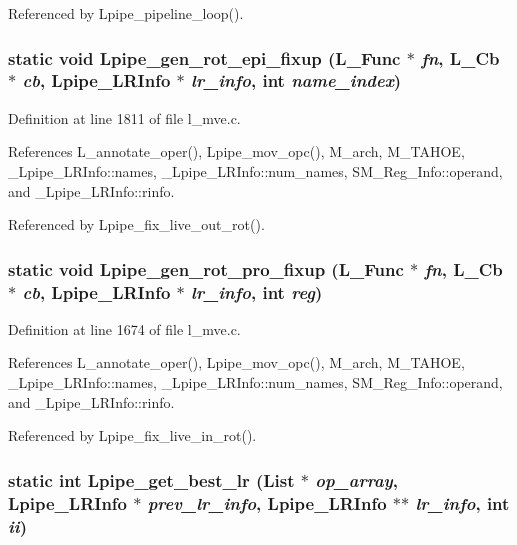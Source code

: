 Referenced by Lpipe\_\-pipeline\_\-loop().
\subsubsection{\setlength{\rightskip}{0pt plus 5cm}static void Lpipe\_\-gen\_\-rot\_\-epi\_\-fixup (L\_\-Func $\ast$ {\em fn}, L\_\-Cb $\ast$ {\em cb}, \bf{Lpipe\_\-LRInfo} $\ast$ {\em lr\_\-info}, int {\em name\_\-index})\hspace{0.3cm}{\tt  [static]}}\label{l__mve_8c_4db10761962fd1923c7ca39914f642cc}




Definition at line 1811 of file l\_\-mve.c.

References L\_\-annotate\_\-oper(), Lpipe\_\-mov\_\-opc(), M\_\-arch, M\_\-TAHOE, \_\-Lpipe\_\-LRInfo::names, \_\-Lpipe\_\-LRInfo::num\_\-names, SM\_\-Reg\_\-Info::operand, and \_\-Lpipe\_\-LRInfo::rinfo.

Referenced by Lpipe\_\-fix\_\-live\_\-out\_\-rot().
\subsubsection{\setlength{\rightskip}{0pt plus 5cm}static void Lpipe\_\-gen\_\-rot\_\-pro\_\-fixup (L\_\-Func $\ast$ {\em fn}, L\_\-Cb $\ast$ {\em cb}, \bf{Lpipe\_\-LRInfo} $\ast$ {\em lr\_\-info}, int {\em reg})\hspace{0.3cm}{\tt  [static]}}\label{l__mve_8c_ae45409fd9131df5bc8f83729510812a}




Definition at line 1674 of file l\_\-mve.c.

References L\_\-annotate\_\-oper(), Lpipe\_\-mov\_\-opc(), M\_\-arch, M\_\-TAHOE, \_\-Lpipe\_\-LRInfo::names, \_\-Lpipe\_\-LRInfo::num\_\-names, SM\_\-Reg\_\-Info::operand, and \_\-Lpipe\_\-LRInfo::rinfo.

Referenced by Lpipe\_\-fix\_\-live\_\-in\_\-rot().
\subsubsection{\setlength{\rightskip}{0pt plus 5cm}static int Lpipe\_\-get\_\-best\_\-lr (List $\ast$ {\em op\_\-array}, \bf{Lpipe\_\-LRInfo} $\ast$ {\em prev\_\-lr\_\-info}, \bf{Lpipe\_\-LRInfo} $\ast$$\ast$ {\em lr\_\-info}, int {\em ii})\hspace{0.3cm}{\tt  [static]}}\label{l__mve_8c_d79d013591249d3e2a5c053799910698}




